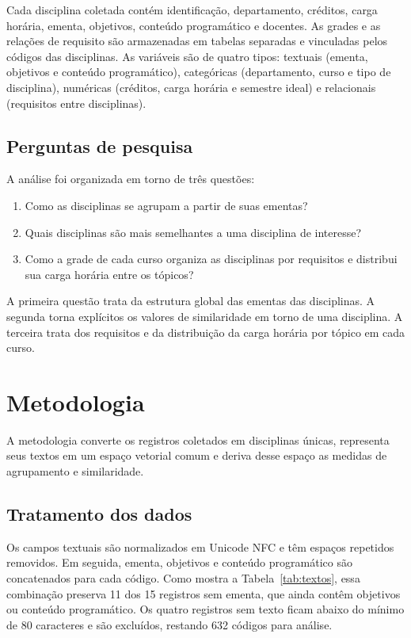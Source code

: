 \documentclass[
  12pt,
  oneside,
  a4paper,
  article,
  brazil
]{USPSC-classe/USPSC}
\begin{document}
Cada disciplina coletada contém identificação, departamento, créditos, carga
horária, ementa, objetivos, conteúdo programático e docentes. As grades e as
relações de requisito são armazenadas em tabelas separadas e vinculadas pelos
códigos das disciplinas. As variáveis são de quatro tipos: textuais (ementa,
objetivos e conteúdo programático), categóricas (departamento, curso e tipo de
disciplina), numéricas (créditos, carga horária e semestre ideal) e relacionais
(requisitos entre disciplinas).

\newpage  

\subsection{Perguntas de pesquisa}

A análise foi organizada em torno de três questões:

\begin{enumerate}
  \item Como as disciplinas se agrupam a partir de suas ementas?
  \item Quais disciplinas são mais semelhantes a uma disciplina de interesse?
  \item Como a grade de cada curso organiza as disciplinas por requisitos e
  distribui sua carga horária entre os tópicos?
\end{enumerate}

A primeira questão trata da estrutura global das ementas das disciplinas. A
segunda torna explícitos os valores de similaridade em torno de uma disciplina.
A terceira trata dos requisitos e da distribuição da carga horária por tópico
em cada curso.

\section{Metodologia}

A metodologia converte os registros coletados em disciplinas únicas, representa
seus textos em um espaço vetorial comum e deriva desse espaço as medidas de
agrupamento e similaridade.

\subsection{Tratamento dos dados}

Os campos textuais são normalizados em Unicode NFC e têm espaços repetidos
removidos. Em seguida, ementa, objetivos e conteúdo programático são
concatenados para cada código. Como mostra a Tabela~\ref{tab:textos}, essa
combinação preserva 11 dos 15 registros sem ementa, que ainda contêm objetivos
ou conteúdo programático. Os quatro registros sem texto ficam abaixo do mínimo
de 80 caracteres e são excluídos, restando 632 códigos para análise.
\end{document}
